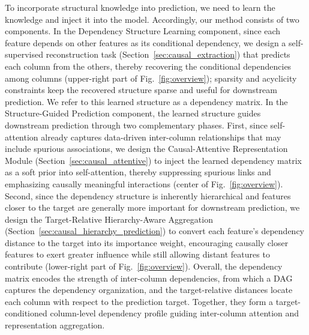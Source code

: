 \documentclass[conference]{IEEEtran}
\newcommand{\zjic}[1]{{\color{black}#1}}
\newcommand{\syic}[1]{{\color{black}#1}}
\newcommand{\syone}[1]{{\color{black}#1}}
\newcommand*{\ourmodel}{TEAL}
\begin{document}

\syic{
\zjic{To incorporate structural knowledge into prediction, 
we need to learn the knowledge and inject it into the model. 
}
Accordingly, our method consists of two components. In the Dependency Structure Learning component, since each feature depends on other features as its conditional dependency,
we design a self-supervised reconstruction task (Section~\ref{sec:causal_extraction}) that predicts each column from the others, thereby recovering the conditional dependencies among columns (upper-right part of Fig.~\ref{fig:overview}); sparsity and acyclicity constraints keep the recovered structure sparse and useful for downstream prediction. \syone{We refer to this learned structure as a dependency matrix.}
In the Structure-Guided Prediction component, the learned structure guides downstream prediction through two complementary phases. First, since self-attention already captures data-driven inter-column relationships that may include spurious associations, we design the Causal-Attentive Representation Module (Section~\ref{sec:causal_attentive}) to inject the learned dependency matrix as a soft prior into self-attention, thereby suppressing spurious links and emphasizing causally meaningful interactions (center of Fig.~\ref{fig:overview}). 
Second, since the dependency structure is inherently hierarchical and features closer to the target are generally more important for downstream prediction, we design the Target-Relative Hierarchy-Aware Aggregation (Section~\ref{sec:causal_hierarchy_prediction}) to convert each feature's dependency distance to the target into its importance weight, encouraging causally closer features to exert greater influence while still allowing distant features to contribute (lower-right part of Fig.~\ref{fig:overview}).}
\zjic{Overall, the dependency matrix encodes the strength of inter-column dependencies, \syone{from which a} DAG captures the dependency organization, and the target-relative distances locate each column with respect to the prediction target. Together, they form a target-conditioned column-level dependency profile guiding inter-column attention and representation aggregation.}
\end{document}
